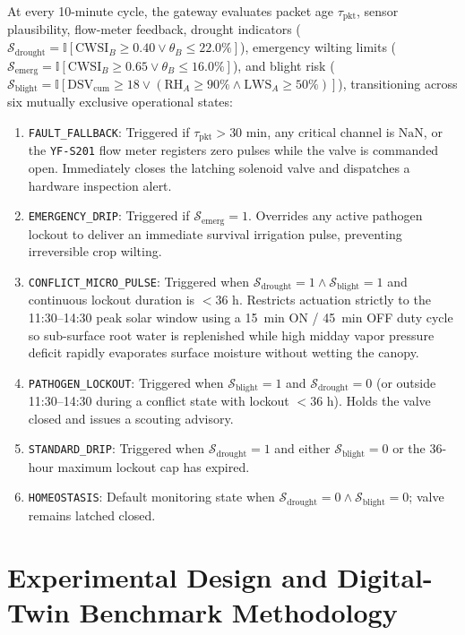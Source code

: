 \documentclass[10pt,twocolumn,a4paper]{article}
\begin{document}
At every 10-minute cycle, the gateway evaluates packet age $\tau_{\text{pkt}}$, sensor plausibility, flow-meter feedback, drought indicators ($\mathcal{S}_{\text{drought}} = \mathbb{I}[\mathrm{CWSI}_B \ge 0.40 \lor \theta_B \le 22.0\%]$), emergency wilting limits ($\mathcal{S}_{\text{emerg}} = \mathbb{I}[\mathrm{CWSI}_B \ge 0.65 \lor \theta_B \le 16.0\%]$), and blight risk ($\mathcal{S}_{\text{blight}} = \mathbb{I}[\mathrm{DSV}_{\text{cum}} \ge 18 \lor (\mathrm{RH}_A \ge 90\% \land \mathrm{LWS}_A \ge 50\%)]$), transitioning across six mutually exclusive operational states:
\begin{enumerate}\setlength{\itemsep}{1pt}\setlength{\parskip}{0pt}
  \item \texttt{FAULT\_FALLBACK}: Triggered if $\tau_{\text{pkt}} > 30\text{ min}$, any critical channel is $\mathrm{NaN}$, or the \texttt{YF-S201} flow meter registers zero pulses while the valve is commanded open. Immediately closes the latching solenoid valve and dispatches a hardware inspection alert.
  \item \texttt{EMERGENCY\_DRIP}: Triggered if $\mathcal{S}_{\text{emerg}} = 1$. Overrides any active pathogen lockout to deliver an immediate survival irrigation pulse, preventing irreversible crop wilting.
  \item \texttt{CONFLICT\_MICRO\_PULSE}: Triggered when $\mathcal{S}_{\text{drought}} = 1 \land \mathcal{S}_{\text{blight}} = 1$ and continuous lockout duration is $< 36\text{ h}$. Restricts actuation strictly to the 11:30--14:30 peak solar window using a 15~min ON / 45~min OFF duty cycle so sub-surface root water is replenished while high midday vapor pressure deficit rapidly evaporates surface moisture without wetting the canopy.
  \item \texttt{PATHOGEN\_LOCKOUT}: Triggered when $\mathcal{S}_{\text{blight}} = 1$ and $\mathcal{S}_{\text{drought}} = 0$ (or outside 11:30--14:30 during a conflict state with lockout $< 36\text{ h}$). Holds the valve closed and issues a scouting advisory.
  \item \texttt{STANDARD\_DRIP}: Triggered when $\mathcal{S}_{\text{drought}} = 1$ and either $\mathcal{S}_{\text{blight}} = 0$ or the 36-hour maximum lockout cap has expired.
  \item \texttt{HOMEOSTASIS}: Default monitoring state when $\mathcal{S}_{\text{drought}} = 0 \land \mathcal{S}_{\text{blight}} = 0$; valve remains latched closed.
\end{enumerate}

\section{Experimental Design and Digital-Twin Benchmark Methodology}
\end{document}
